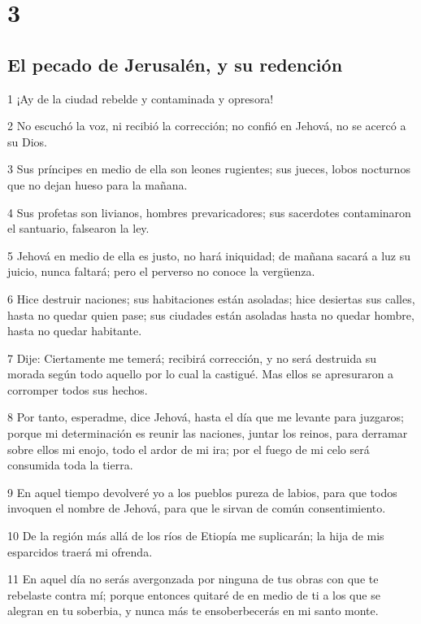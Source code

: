 \chapter{3}

\section*{El pecado de Jerusalén, y su redención}

\par 1 ¡Ay de la ciudad rebelde y contaminada y opresora!
\par 2 No escuchó la voz, ni recibió la corrección; no confió en Jehová, no se acercó a su Dios.
\par 3 Sus príncipes en medio de ella son leones rugientes; sus jueces, lobos nocturnos que no dejan hueso para la mañana.
\par 4 Sus profetas son livianos, hombres prevaricadores; sus sacerdotes contaminaron el santuario, falsearon la ley.
\par 5 Jehová en medio de ella es justo, no hará iniquidad; de mañana sacará a luz su juicio, nunca faltará; pero el perverso no conoce la vergüenza.
\par 6 Hice destruir naciones; sus habitaciones están asoladas; hice desiertas sus calles, hasta no quedar quien pase; sus ciudades están asoladas hasta no quedar hombre, hasta no quedar habitante.
\par 7 Dije: Ciertamente me temerá; recibirá corrección, y no será destruida su morada según todo aquello por lo cual la castigué. Mas ellos se apresuraron a corromper todos sus hechos. 
\par 8 Por tanto, esperadme, dice Jehová, hasta el día que me levante para juzgaros; porque mi determinación es reunir las naciones, juntar los reinos, para derramar sobre ellos mi enojo, todo el ardor de mi ira; por el fuego de mi celo será consumida toda la tierra.
\par 9 En aquel tiempo devolveré yo a los pueblos pureza de labios, para que todos invoquen el nombre de Jehová, para que le sirvan de común consentimiento.
\par 10 De la región más allá de los ríos de Etiopía me suplicarán; la hija de mis esparcidos traerá mi ofrenda.
\par 11 En aquel día no serás avergonzada por ninguna de tus obras con que te rebelaste contra mí; porque entonces quitaré de en medio de ti a los que se alegran en tu soberbia, y nunca más te ensoberbecerás en mi santo monte.
